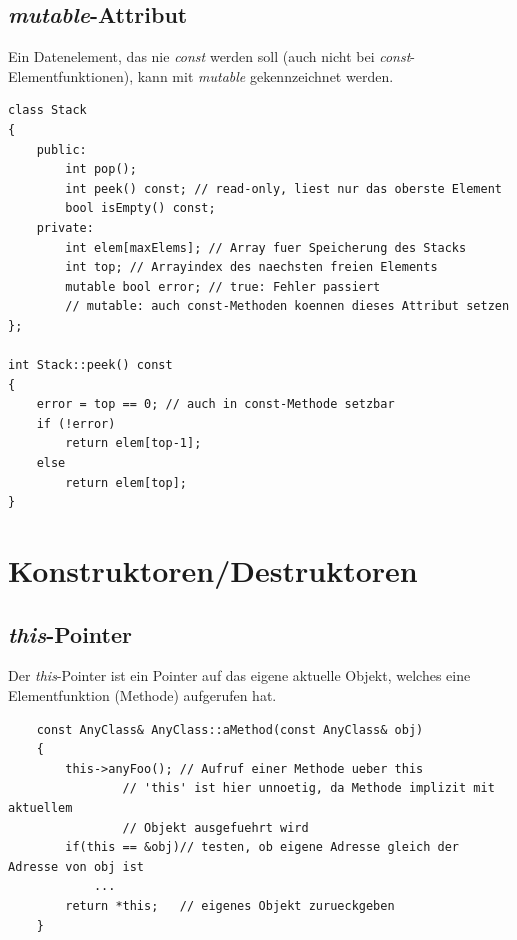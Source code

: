 \subsection{\emph{mutable}-Attribut}
Ein Datenelement, das nie \emph{const} werden soll (auch nicht bei \emph{const}-Elementfunktionen), kann mit \emph{mutable} gekennzeichnet werden.
\vspace{-\baselineskip}
\begin{minipage}{0.85\linewidth}
\begin{lstlisting}
class Stack
{
	public:
		int pop();
		int peek() const; // read-only, liest nur das oberste Element
		bool isEmpty() const;
	private:
		int elem[maxElems]; // Array fuer Speicherung des Stacks
		int top; // Arrayindex des naechsten freien Elements
		mutable bool error; // true: Fehler passiert
		// mutable: auch const-Methoden koennen dieses Attribut setzen
};

int Stack::peek() const
{
	error = top == 0; // auch in const-Methode setzbar
	if (!error)
		return elem[top-1];
	else
		return elem[top];
}
\end{lstlisting}
\end{minipage}

\clearpage
\section{Konstruktoren/Destruktoren}

\subsection{\emph{this}-Pointer}
Der \emph{this}-Pointer ist ein Pointer auf das eigene aktuelle Objekt, welches eine Elementfunktion (Methode) aufgerufen hat.
\vspace{-\baselineskip}
\begin{minipage}{\linewidth}
	\begin{lstlisting}
	const AnyClass& AnyClass::aMethod(const AnyClass& obj)
	{
		this->anyFoo();	// Aufruf einer Methode ueber this
				// 'this' ist hier unnoetig, da Methode implizit mit aktuellem
				// Objekt ausgefuehrt wird
		if(this == &obj)// testen, ob eigene Adresse gleich der Adresse von obj ist
			...
		return *this;	// eigenes Objekt zurueckgeben
	}
	\end{lstlisting}
\end{minipage}

